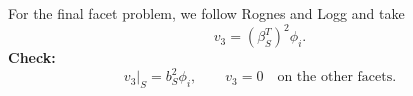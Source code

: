 \documentclass[12pt,a4paper]{article}
\begin{document}
\begin{itemize}

\end{itemize}


For the final facet problem, we follow Rognes and Logg and take
\begin{equation}
    v_3=(\beta_S^T)^2\phi_i.
\end{equation}
\textbf{Check:}
\begin{equation}
    v_3|_S=b_S^2\phi_i,
    \qquad v_3=0\quad\text{on the other facets}.
\end{equation}







\end{document}
